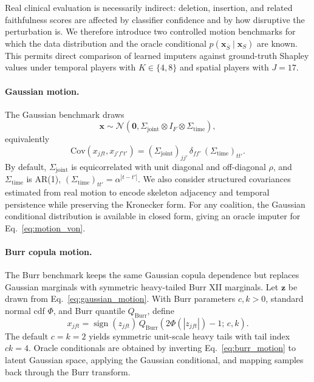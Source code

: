 Real clinical evaluation is necessarily indirect: deletion, insertion, and related faithfulness scores are affected by classifier confidence and by how disruptive the perturbation is.  We therefore introduce two controlled motion benchmarks for which the data distribution and the oracle conditional $p(\mathbf{x}_{\bar S}\mid\mathbf{x}_S)$ are known.  This permits direct comparison of learned imputers against ground-truth Shapley values under temporal players with $K\in\{4,8\}$ and spatial players with $J=17$.

\paragraph{Gaussian motion.}
The Gaussian benchmark draws
\begin{equation}
  \mathbf{x}\sim
  \mathcal{N}\!\left(
    \mathbf{0},
    \Sigma_{\mathrm{joint}}\otimes I_F\otimes\Sigma_{\mathrm{time}}
  \right),
  \label{eq:gaussian_motion}
\end{equation}
equivalently
\[
\mathrm{Cov}(x_{jft},x_{j'f't'})
=
(\Sigma_{\mathrm{joint}})_{jj'}\,\delta_{ff'}\,(\Sigma_{\mathrm{time}})_{tt'}.
\]
By default, $\Sigma_{\mathrm{joint}}$ is equicorrelated with unit diagonal and off-diagonal $\rho$, and $\Sigma_{\mathrm{time}}$ is AR(1), $(\Sigma_{\mathrm{time}})_{tt'}=\alpha^{|t-t'|}$.  We also consider structured covariances estimated from real motion to encode skeleton adjacency and temporal persistence while preserving the Kronecker form.  For any coalition, the Gaussian conditional distribution is available in closed form, giving an oracle imputer for Eq.~\eqref{eq:motion_von}.

\paragraph{Burr copula motion.}
The Burr benchmark keeps the same Gaussian copula dependence but replaces Gaussian marginals with symmetric heavy-tailed Burr XII marginals.  Let $\mathbf{z}$ be drawn from Eq.~\eqref{eq:gaussian_motion}.  With Burr parameters $c,k>0$, standard normal cdf $\Phi$, and Burr quantile $Q_{\mathrm{Burr}}$, define
\begin{equation}
  x_{jft}
  =
  \operatorname{sign}(z_{jft})\,
  Q_{\mathrm{Burr}}\!\left(2\Phi(|z_{jft}|)-1;\,c,k\right).
  \label{eq:burr_motion}
\end{equation}
The default $c=k=2$ yields symmetric unit-scale heavy tails with tail index $ck=4$.  Oracle conditionals are obtained by inverting Eq.~\eqref{eq:burr_motion} to latent Gaussian space, applying the Gaussian conditional, and mapping samples back through the Burr transform.

